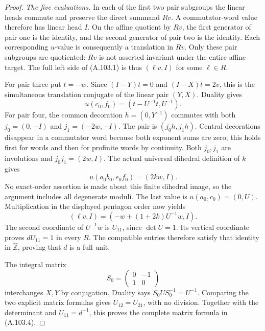 \begin{proof}
\emph{The five evaluations.}
In each of the first two pair subgroups the linear heads commute
and preserve the direct summand \(Rv\). A commutator-word value
therefore has linear head \(I\). On the affine quotient by \(Rv\),
the first generator of pair one is the identity, and the second
generator of pair two is the identity. Each corresponding
\(u\)-value is consequently a translation in \(Rv\).
Only these pair subgroups are quotiented: \(Rv\) is not asserted
invariant under the entire affine target. The full left side of
(A.103.1) is thus \((\ell v,I)\) for some \(\ell\in R\).

For pair three put \(t=-w\).
Since \((I-Y)t=0\) and \((I-X)t=2v\), this is the simultaneous
translation conjugate of the linear pair \((Y,X)\).
Duality gives
\[
 u(c_0,f_0)=(t-U^{-1}t,U^{-1}).
 \tag{A.103.12}
\]
For pair four, the common decoration \(h=(0,Y^{-1})\) commutes
with both \(j_0=(0,-I)\) and \(j_1=(-2w,-I)\).
The pair is \((j_0h,j_1h)\). Central decorations disappear in a
commutator word because both exponent sums are zero; this holds
first for words and then for profinite words by continuity.
Both \(j_0,j_1\) are involutions and \(j_0j_1=(2w,I)\).
The actual universal dihedral definition of \(k\) gives
\[
 u(a_0b_0,e_0f_0)=(2kw,I).
 \tag{A.103.13}
\]
No exact-order assertion is made about this finite dihedral image,
so the argument includes all degenerate moduli.
The last value is \(u(a_0,c_0)=(0,U)\).
Multiplication in the displayed pentagon order now yields
\[
 (\ell v,I)=(-w+(1+2k)U^{-1}w,I).
 \tag{A.103.14}
\]
The second coordinate of \(U^{-1}w\) is \(U_{11}\), since
\(\det U=1\). Its vertical coordinate proves \(dU_{11}=1\) in
every \(R\). The compatible entries therefore satisfy that identity
in \(\widehat{\mathbb Z}\), proving that \(d\) is a full unit.

The integral matrix
\[
 S_0=\begin{pmatrix}0&-1\\1&0\end{pmatrix}
 \tag{A.103.15}
\]
interchanges \(X,Y\) by conjugation. Duality says
\(S_0US_0^{-1}=U^{-1}\). Comparing the two explicit matrix formulas
gives \(U_{12}=U_{21}\), with no division.
Together with the determinant and \(U_{11}=d^{-1}\), this proves
the complete matrix formula in (A.103.4).


\end{proof}
